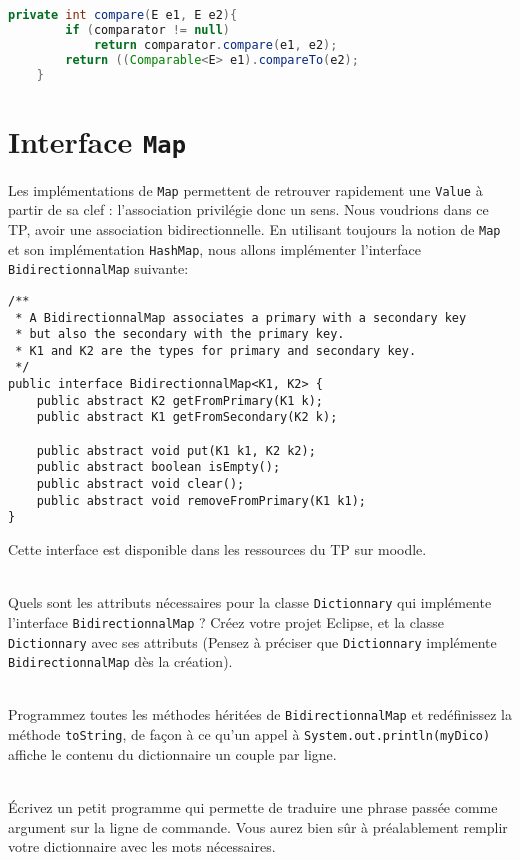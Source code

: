 \documentclass[iutinfo,a4paper,10pt]{ustl-tdtp}
\begin{document}
\begin{correction}
{\color{red}
\begin{lstlisting}[language=Java]
    private int compare(E e1, E e2){
        if (comparator != null)
            return comparator.compare(e1, e2);
        return ((Comparable<E> e1).compareTo(e2);
    }
\end{lstlisting}
}

\end{correction}

\section{Interface \texttt{Map}}
Les implémentations de \texttt{Map} permettent de retrouver rapidement
une \texttt{Value} à partir de sa clef : l'association privilégie donc
un sens. Nous voudrions dans ce TP, avoir une association
bidirectionnelle. En utilisant toujours la notion de \texttt{Map} et
son implémentation \texttt{HashMap}, nous
allons implémenter l'interface \texttt{BidirectionnalMap} suivante:

\begin{verbatim}
/**
 * A BidirectionnalMap associates a primary with a secondary key  
 * but also the secondary with the primary key.
 * K1 and K2 are the types for primary and secondary key.
 */
public interface BidirectionnalMap<K1, K2> {
    public abstract K2 getFromPrimary(K1 k);
    public abstract K1 getFromSecondary(K2 k);

    public abstract void put(K1 k1, K2 k2);
    public abstract boolean isEmpty();
    public abstract void clear();
    public abstract void removeFromPrimary(K1 k1);
}
\end{verbatim}

Cette interface est disponible dans les ressources du TP sur moodle.

~\\ \question Quels sont les attributs nécessaires pour la
classe \texttt{Dictionnary} qui implémente l'interface
\texttt{BidirectionnalMap} ? Créez votre projet Eclipse, et la classe
\texttt{Dictionnary} avec ses attributs (Pensez à préciser que
\texttt{Dictionnary} implémente \texttt{BidirectionnalMap} dès la
création).

~\\ \question Programmez toutes les méthodes héritées de
\texttt{BidirectionnalMap} et redéfinissez la méthode
\texttt{toString}, de façon à ce qu'un appel à
\texttt{System.out.println(myDico)} affiche le contenu du dictionnaire
un couple par ligne.

~\\ \question Écrivez un petit programme qui permette de
traduire une phrase passée comme argument sur la ligne de commande. Vous aurez bien sûr à préalablement remplir votre dictionnaire avec les mots nécessaires.
\end{document}

